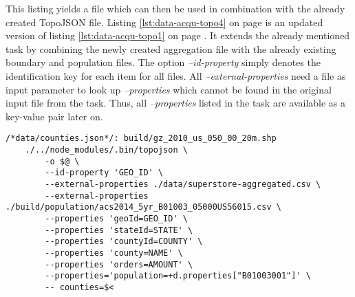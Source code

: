 This listing yields a file which can then be used in combination with the already created TopoJSON file. Listing \ref{lst:data-acqu-topo4} on page \pageref{lst:data-acqu-topo4} is an updated version of listing \ref{lst:data-acqu-topo1} on page \pageref{lst:data-acqu-topo1}. It extends the already mentioned task by combining the newly created aggregation file with the already existing boundary and population files. The option \textit{--id-property} simply denotes the identification key for each item for all files. All \textit{--external-properties} need a file as input parameter to look up \textit{--properties} which cannot be found in the original input file from the task. Thus, all \textit{--properties} listed in the task are available as a key-value pair later on.

\begin{lstlisting}[style={makefile}, caption={Make task for merging a file with topojson}, label={lst:data-acqu-topo4}]
/*data/counties.json*/: build/gz_2010_us_050_00_20m.shp
    ./../node_modules/.bin/topojson \
        -o $@ \
        --id-property 'GEO_ID' \
        --external-properties ./data/superstore-aggregated.csv \
        --external-properties ./build/population/acs2014_5yr_B01003_05000US56015.csv \
        --properties 'geoId=GEO_ID' \
        --properties 'stateId=STATE' \
        --properties 'countyId=COUNTY' \
        --properties 'county=NAME' \
        --properties 'orders=AMOUNT' \
        --properties='population=+d.properties["B01003001"]' \
        -- counties=$<
\end{lstlisting}
